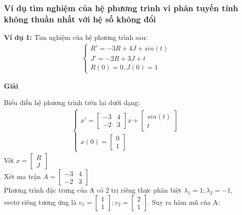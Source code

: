 \subsubsection{Ví dụ tìm nghiệm của hệ phương trình vi phân tuyến tính không thuần nhất với hệ số không đổi}
\textbf{Ví dụ 1:} Tìm nghiệm của hệ phương trình sau:
\begin{align*}
    \begin{cases}
        R'=-3R+4J+sin(t)\\
        J'=-2R+3J+t\\
        R(0)=0, J(0)=1
    \end{cases}
\end{align*}
\centerline{\textbf{Giải}}
Biểu diễn hệ phương trình trên lại dưới dạng:
\begin{align*}
    \begin{cases}
        x'=
        \begin{bmatrix}
        -3 & 4\\
        -2 & 3
        \end{bmatrix}
        x+
        \begin{bmatrix}
        sin(t)\\
        t
        \end{bmatrix}\\
        x(0)=\begin{bmatrix}
        0\\
        1
        \end{bmatrix}
    \end{cases}
\end{align*}
\hspace{0.3cm}Với $x=
\begin{bmatrix}
    R\\
    J
\end{bmatrix}$\\
Xét ma trận $A=
\begin{bmatrix}
    -3&4\\
    -2&3
\end{bmatrix}
$\\
Phương trình đặc trưng của A có 2 trị riêng thực phân biệt $\lambda_1=1; \lambda_2=-1$, vectơ riêng tương ứng là $v_1=
\begin{bmatrix}
    1\\
    1
\end{bmatrix};
v_2=
\begin{bmatrix}
    2\\
    1
\end{bmatrix}
$.
Suy ra hàm mũ của A:\\
